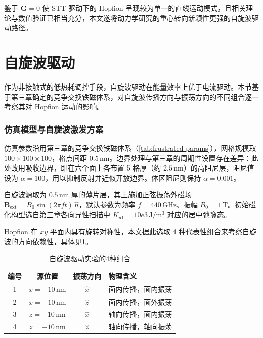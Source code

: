 \documentclass{article}
\begin{document}
鉴于 $\mathbf{G} = 0$ 使 STT 驱动下的 Hopfion 呈现较为单一的直线运动模式，且相关理论与数值验证已相当充分\cite{wang2019current,liu2020three}，本文遂将动力学研究的重心转向新颖性更强的自旋波驱动路径。


\section{自旋波驱动}

作为非接触式的低热耗调控手段，自旋波驱动在能量效率上优于电流驱动。本节基于第三章确定的竞争交换铁磁体系，对自旋波传播方向与振荡方向的不同组合逐一考察其对 Hopfion 运动的影响。

\subsubsection*{仿真模型与自旋波激发方案}
仿真参数沿用第三章的竞争交换铁磁体系（\ref{tab:frustrated-params}），网格规模取 $100 \times 100 \times 100$，格点间距 $0.5\,\mathrm{nm}$。边界处理与第三章的周期性设置存在差异：此处改用吸收边界，即在六个面上各布置 5 格厚（约 $2.5\,\mathrm{nm}$）的高阻尼层，阻尼值设为 $\alpha = 100$，用以抑制反射并近似开放边界。体区阻尼则保持 $\alpha = 0.001$。

自旋波源取为 $0.5\,\mathrm{nm}$ 厚的薄片层，其上施加正弦振荡外磁场 $\mathbf{B}_{\text{ext}} = B_0 \sin(2\pi f t) \, \hat{n}$，默认参数为频率 $f = 440\,\mathrm{GHz}$、振幅 $B_0 = 1\,\mathrm{T}$。初始磁化构型选自第三章各向异性扫描中 $K_{u1} = 10e3\,\mathrm{J/m^3}$ 对应的居中弛豫态。

Hopfion 在 $xy$ 平面内具有旋转对称性，本文据此选取 4 种代表性组合来考察自旋波的方向依赖性，具体见\ref{tab:sw-combos}。

\begin{table}[htbp]
  \centering
  \caption{自旋波驱动实验的4种组合}
  \label{tab:sw-combos}
  \begin{tabular}{cccl}
    \toprule
    编号 & 源位置 & 振荡方向 & 物理含义 \\
    \midrule
    1 & $x = -10\,\mathrm{nm}$ & $\hat{x}$ & 面内传播，面内振荡 \\
    2 & $x = -10\,\mathrm{nm}$ & $\hat{z}$ & 面内传播，面外振荡 \\
    3 & $z = -10\,\mathrm{nm}$ & $\hat{x}$ & 轴向传播，面内振荡 \\
    4 & $z = -10\,\mathrm{nm}$ & $\hat{z}$ & 轴向传播，轴向振荡 \\
    \bottomrule
  \end{tabular}
\end{table}
\end{document}
